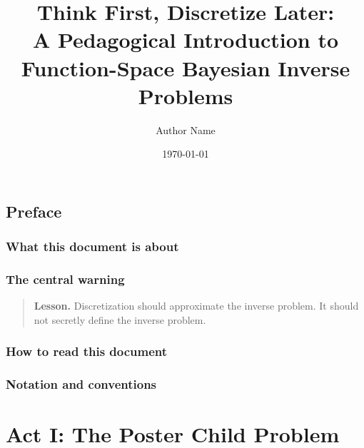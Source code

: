 \documentclass[11pt,a4paper]{book}
\newenvironment{lesson}
  {\begin{quote}\textbf{Lesson.}}
  {\end{quote}}
\begin{document}
\frontmatter

\title{Think First, Discretize Later:\\
A Pedagogical Introduction to Function-Space Bayesian Inverse Problems}
\author{Author Name}
\date{\today}

\maketitle

\tableofcontents


\chapter*{Preface}

\section*{What this document is about}

\section*{The central warning}

\begin{lesson}
Discretization should approximate the inverse problem.
It should not secretly define the inverse problem.
\end{lesson}

\section*{How to read this document}

\section*{Notation and conventions}

\mainmatter


\part{Act I: The Poster Child Problem}
\end{document}
